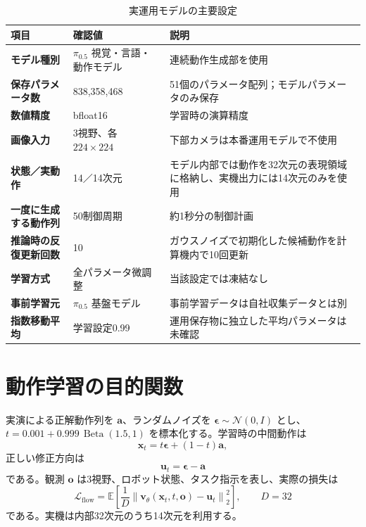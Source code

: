 \begin{table}[H]
\centering
\caption{実運用モデルの主要設定}
\begin{tabularx}{\textwidth}{>{\bfseries}p{38mm}p{35mm}X}
\toprule
項目 & 確認値 & 説明\\
\midrule
モデル種別 & $\pi_{0.5}$ 視覚・言語・動作モデル & 連続動作生成部を使用\\
保存パラメータ数 & 838,358,468 & 51個のパラメータ配列；モデルパラメータのみ保存\\
数値精度 & bfloat16 & 学習時の演算精度\\
画像入力 & 3視野、各 $224\times224$ & 下部カメラは本番運用モデルで不使用\\
状態／実動作 & 14／14次元 & モデル内部では動作を32次元の表現領域に格納し、実機出力には14次元のみを使用\\
一度に生成する動作列 & 50制御周期 & 約1秒分の制御計画\\
推論時の反復更新回数 & 10 & ガウスノイズで初期化した候補動作を計算機内で10回更新\\
学習方式 & 全パラメータ微調整 & 当該設定では凍結なし\\
事前学習元 & $\pi_{0.5}$ 基盤モデル & 事前学習データは自社収集データとは別\\
指数移動平均 & 学習設定0.99 & 運用保存物に独立した平均パラメータは未確認\\
\bottomrule
\end{tabularx}
\end{table}

\section{動作学習の目的関数}

実演による正解動作列を $\mathbf{a}$、ランダムノイズを
$\boldsymbol{\epsilon}\sim\mathcal{N}(0,I)$ とし、
$t=0.001+0.999\,\operatorname{Beta}(1.5,1)$ を標本化する。学習時の中間動作は
\[
\mathbf{x}_t=t\boldsymbol{\epsilon}+(1-t)\mathbf{a},
\]
正しい修正方向は
\[
\mathbf{u}_t=\boldsymbol{\epsilon}-\mathbf{a}
\]
である。観測 $\mathbf{o}$ は3視野、ロボット状態、タスク指示を表し、実際の損失は
\[
\mathcal{L}_{\mathrm{flow}}
=\mathbb{E}\!\left[
\frac{1}{D}\left\|
\mathbf{v}_\theta(\mathbf{x}_t,t,\mathbf{o})-\mathbf{u}_t
\right\|_2^2\right],
\qquad D=32
\]
である。実機は内部32次元のうち14次元を利用する。


